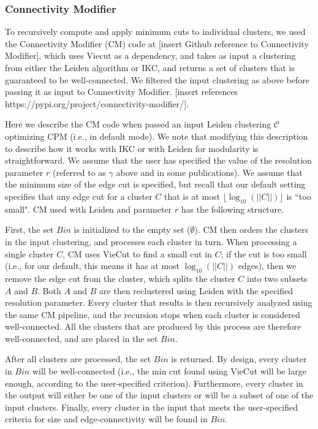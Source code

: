 \documentclass[11pt]{article}   	%
\begin{document}
\subsubsection{Connectivity Modifier} To recursively compute and apply minimum cuts to individual clusters, we used the Connectivity Modifier (CM) code at [insert Github reference to Connectivity Modifier], which uses Viecut \citep{Henzinger2018,Henzinger2019} as a dependency, and takes as input a clustering from either the Leiden algorithm or IKC, and returns a set of clusters that is guaranteed to be
well-connected.
We filtered the input clustering as above before passing it as input to Connectivity Modifier. [insert references https://pypi.org/project/connectivity-modifier/].

Here we describe the CM code when passed an input  Leiden clustering $\mathcal{C}$  optimizing CPM (i.e., in default mode). We note that modifying this description to describe how it works with IKC or with Leiden for modularity is straightforward.
We assume that the user has specified the value of the resolution parameter $r$ (referred to as $\gamma$ above and in some publications).
We assume that the minimum size of the edge cut is specified, but recall that our default setting specifies that any edge cut for a cluster $C$ that is at most $ \lfloor \log_{10}(||C||) \rfloor$ is ``too small".
CM used with Leiden and parameter $r$ has the following structure.


First, the set $Bin$ is initialized to the empty set  ($\emptyset$).
CM  then orders the clusters in the input clustering, and   processes each cluster in  turn.
When processing a single cluster $C$,
CM uses VieCut to find a small cut in $C$;  if the cut is too small (i.e., for our default, this means it has at most $\log_{10}(||C||)$ edges), then
we remove the edge cut from the cluster, which splits the cluster $C$ into two  subsets $A$ and $B$.
Both $A$ and $B$ are then reclustered using Leiden with the specified resolution parameter.
Every cluster that results is then recursively analyzed using the same CM pipeline, and the recursion stops when each cluster is considered well-connected.
All the clusters that are produced by this process are therefore well-connected, and are placed in the set $Bin$.

After all clusters are processed, the set $Bin$ is returned.
By design, every cluster in  $Bin$ will be well-connected (i.e., the min cut found using VieCut will be large enough, according to the user-specified criterion).
Furthermore, every cluster in the output will either be one of the input clusters or will be a subset of one of the input clusters.
Finally, every cluster in the input that meets the user-specified criteria for size and edge-connectivity will be found in $Bin$.
\end{document}
